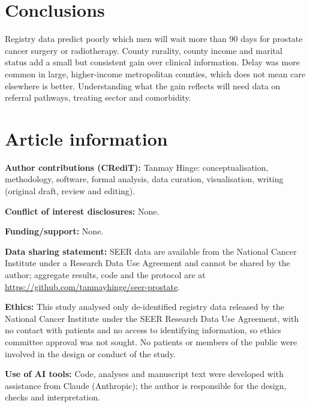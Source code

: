 \documentclass[10pt,a4paper,twocolumn]{article}
\begin{document}
\section{Conclusions}
Registry data predict poorly which men will wait more than 90 days for prostate cancer surgery or radiotherapy. County rurality, county income and marital status add a small but consistent gain over clinical information. Delay was more common in large, higher-income metropolitan counties, which does not mean care elsewhere is better. Understanding what the gain reflects will need data on referral pathways, treating sector and comorbidity.

\section*{Article information}
{\footnotesize\setlength{\parindent}{0pt}\setlength{\parskip}{3pt}
\textsf{\textbf{Author contributions (CRediT):}} Tanmay Hinge: conceptualisation, methodology, software, formal analysis, data curation, visualisation, writing (original draft, review and editing).\par
\textsf{\textbf{Conflict of interest disclosures:}} None.\par
\textsf{\textbf{Funding/support:}} None.\par
\textsf{\textbf{Data sharing statement:}} SEER data are available from the National Cancer Institute under a Research Data Use Agreement and cannot be shared by the author; aggregate results, code and the protocol are at \url{https://github.com/tanmayhinge/seer-prostate}.\par
\textsf{\textbf{Ethics:}} This study analysed only de-identified registry data released by the National Cancer Institute under the SEER Research Data Use Agreement, with no contact with patients and no access to identifying information, so ethics committee approval was not sought. No patients or members of the public were involved in the design or conduct of the study.\par
\textsf{\textbf{Use of AI tools:}} Code, analyses and manuscript text were developed with assistance from Claude (Anthropic); the author is responsible for the design, checks and interpretation.\par
}
\end{document}
